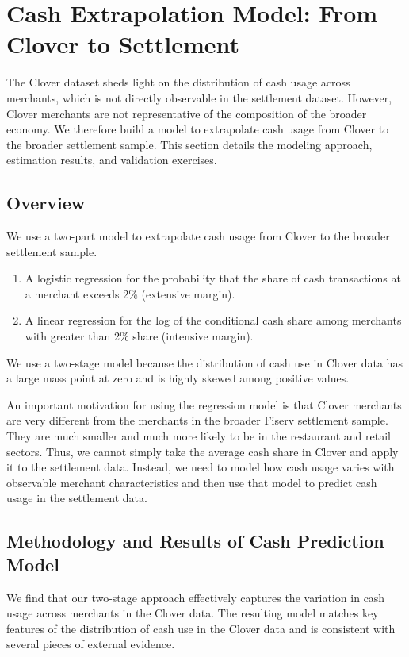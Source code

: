 \documentclass[main.tex]{subfiles}
\begin{document}
\section{Cash Extrapolation Model: From Clover to Settlement}
\label{sec:appendix-cash-model}

The Clover dataset sheds light on the distribution of cash usage across merchants, which is not directly observable in the settlement dataset.
However, Clover merchants are not representative of the composition of the broader economy.
We therefore build a model to extrapolate cash usage from Clover to the broader settlement sample.
This section details the modeling approach, estimation results, and validation exercises.

\subsection{Overview}

We use a two-part model to extrapolate cash usage from Clover to the broader settlement sample.

\begin{enumerate}
    \item A logistic regression for the probability that the share of cash transactions at a merchant exceeds 2\% (extensive margin).
    \item A linear regression for the log of the conditional cash share among merchants with greater than 2\% share (intensive margin).
\end{enumerate}
We use a two-stage model because the distribution of cash use in Clover data has a large mass point at zero and is highly skewed among positive values.

An important motivation for using the regression model is that Clover merchants are very different from the merchants in the broader Fiserv settlement sample.
They are much smaller and much more likely to be in the restaurant and retail sectors.
Thus, we cannot simply take the average cash share in Clover and apply it to the settlement data.
Instead, we need to model how cash usage varies with observable merchant characteristics and then use that model to predict cash usage in the settlement data.

\subsection{Methodology and Results of Cash Prediction Model}

We find that our two-stage approach effectively captures the variation in cash usage across merchants in the Clover data.
The resulting model matches key features of the distribution of cash use in the Clover data and is consistent with several pieces of external evidence.
\end{document}
